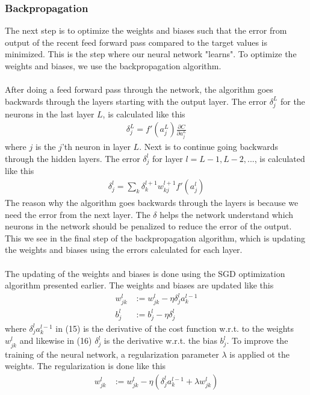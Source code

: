 \documentclass[a4paper,twocolumn]{article}
\begin{document}
\subsubsection{Backpropagation}
The next step is to optimize the weights and biases such that the error from output of the recent feed forward pass compared to the target values is minimized. This is the step where our neural network "learns". To optimize the weights and biases, we use the backpropagation algorithm.\\
\\
After doing a feed forward pass through the network, the algorithm goes backwards through the layers starting with the output layer. The error $\delta_{j}^{L}$ for the neurons in the last layer $L$, is calculated like this
\begin{align}
    \delta_{j}^{L} = f'(a_{j}^{L})\frac{\partial C}{\partial a_{j}^{L}}
\end{align}
where $j$ is the $j$'th neuron in layer $L$. Next is to continue going backwards through the hidden layers. The error $\delta_{j}^{l}$ for layer $l = L-1, L-2, ...$, is calculated like this
\begin{align}
    \delta_{j}^{l} = \sum_{k}\delta_{k}^{l+1}w_{kj}^{l+1}f'(a_{j}^{l})
\end{align}
The reason why the algorithm goes backwards through the layers is because we need the error from the next layer. The $\delta$ helps the network understand which neurons in the network should be penalized to reduce the error of the output. This we see in the final step of the backpropagation algorithm, which is updating the weights and biases using the errors calculated for each layer.\\
\\
The updating of the weights and biases is done using the SGD optimization algorithm presented earlier. The weights and biases are updated like this
\begin{align}
    w_{jk}^{l} &:= w_{jk}^{l} - \eta \delta_{j}^{l} a_{k}^{l - 1}\\
    b_{j}^{l} &:= b_{j}^{l} - \eta \delta_{j}^{l}
\end{align}
where $\delta_{j}^{l}a_{k}^{l - 1}$ in (15) is the derivative of the cost function w.r.t. to the weights $w_{jk}^{l}$ and likewise in (16) $\delta_{j}^{l}$ is the derivative w.r.t. the bias $b_{j}^{l}$. To improve the training of the neural network, a regularization parameter $\lambda$ is applied ot the weights. The regularization is done like this
\begin{align}
    w_{jk}^{l} &:= w_{jk}^{l} - \eta (\delta_{j}^{l} a_{k}^{l - 1} + \lambda w_{jk}^{l})
\end{align}
\end{document}
